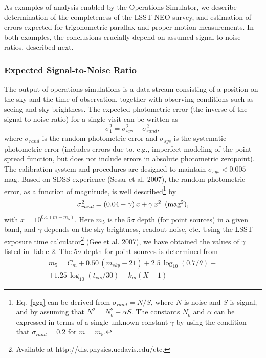 \documentclass{emulateapj}
\begin{document}
As examples of analysis enabled by the Operations Simulator, we describe 
determination of the completeness of the LSST NEO survey, and estimation 
of errors expected for trigonometric parallax and proper motion measurements. 
In both examples, the conclusions crucially depend on assumed signal-to-noise
ratios, described next.

\subsubsection{  Expected Signal-to-Noise Ratio } 

The output of operations simulations is a data stream consisting of 
a position on the sky and the time of observation, together with 
observing conditions such as seeing and sky brightness. The expected 
photometric error (the inverse of the signal-to-noise ratio) for a single visit
can be written as
\begin{equation}
         \sigma_1^2 = \sigma_{sys}^2 + \sigma_{rand}^2,
\end{equation}
where $\sigma_{rand}$ is the random photometric error and $\sigma_{sys}$ is 
the systematic photometric error (includes errors due to, e.g., imperfect
modeling of the point spread function, but does not include errors in 
absolute photometric zeropoint). The calibration system and procedures
are designed to maintain $\sigma_{sys}<0.005$ mag. Based on 
SDSS experience (Sesar et al. 2007), the random photometric error, as
a function of magnitude, is well described\footnote{Eq.~\ref{ggg} can 
be derived from $\sigma_{rand}=N/S$, where $N$ is noise and $S$ is signal, 
and by assuming that $N^2 = N_o^2 + \alpha S$. The constants $N_o$ and 
$\alpha$ can be expressed in terms of a single unknown constant $\gamma$ 
by using the condition that $\sigma_{rand}=0.2$ for $m=m_5$.} by
\begin{equation}
\label{ggg}
  \sigma_{rand}^2 = (0.04-\gamma)\, x + \gamma \, x^2 \,\,\, {\rm (mag^2),}
\end{equation}
with $x = 10^{0.4\,(m-m_5)}$. Here $m_5$ is the 5$\sigma$ depth (for
point sources) in a given band, and $\gamma$ depends on the sky 
brightness, readout noise, etc. Using the LSST exposure time 
calculator\footnote{Available at http://dls.physics.ucdavis.edu/etc.} 
(Gee et al. 2007), we have obtained the values of $\gamma$ 
listed in Table 2. The 5$\sigma$ depth for point sources is determined from 
\begin{eqnarray}
\label{m5}
  m_5 = C_m + 0.50\,(m_{sky}-21) + 2.5\,\log_{10}(0.7/\theta) +  \nonumber \\
        + 1.25\,\log_{10}(t_{vis}/30) - k_m(X-1) \phantom{xxxxx}
\end{eqnarray}
\end{document}
